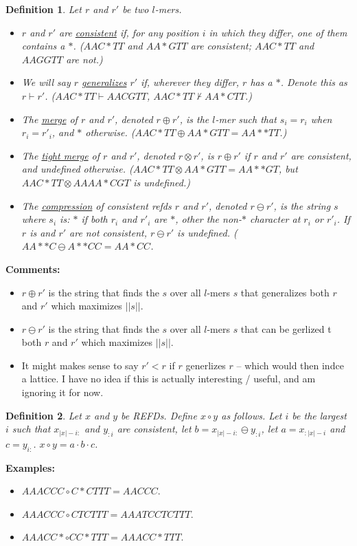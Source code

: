 \documentclass{article}
\newtheorem{definition}{Definition}
\begin{document}
\begin{definition}
Let $r$ and $r'$ be two $l$-mers.
\begin{itemize}
\item $r$ and $r'$ are \underline{consistent} if,
  for any position $i$ in which they differ, one of them contains a
  $*$.  ($AAC*TT$ and $AA*GTT$ are consistent; $AAC*TT$ and $AAGGTT$
  are not.)
\item We will say $r$ \underline{generalizes} $r'$ if, wherever they differ,
  $r$ has a $*$.  Denote this as $r \vdash r'$.  ($AAC*TT \vdash AACGTT$, 
  $AAC*TT \not\vdash AA*CTT$.)
\item The \underline{merge} of $r$ and $r'$, denoted $r \oplus r'$, is
  the $l$-mer such that $s_i = r_i$ when $r_i=r'_i$,
  and $*$ otherwise. ($AAC*TT \oplus AA*GTT = AA**TT$.) 
\item The \underline{tight merge} of $r$ and $r'$, denoted $r \otimes r'$,
  is $r \oplus r'$ if $r$ and $r'$ are consistent, and undefined
  otherwise. ($AAC*TT \otimes AA*GTT = AA**GT$, but $AAC*TT \otimes AAAA*CGT$ is undefined.)
\item The \underline{compression} of consistent refds $r$ and $r'$, denoted $r\ominus r'$, 
  is the string $s$ where $s_i$ is: $*$ if both $r_i$ and $r'_i$ are
  $*$, other the non-$*$ character at $r_i$ or $r'_i$.  If $r$ is and
  $r'$ are not consistent, $r \ominus r'$ is undefined.  ($AA**C
  \ominus A**CC = AA*CC$.
\end{itemize}
\end{definition}

{\bf Comments:}
\begin{itemize}
\item $r \oplus r'$ is the string that finds the $s$ over all
$l$-mers $s$ that generalizes both $r$ and $r'$ which maximizes $||s||$.
\item $r \ominus r'$ is the string that finds the $s$ over all
  $l$-mers $s$ that can be gerlized t both $r$ and $r'$ which
  maximizes $||s||$.
\item It might makes sense to say $r' < r$ if $r$ generlizes $r$ --
  which would then indce a lattice.  I have no idea if this is
  actually interesting / useful, and am ignoring it for now.
\end{itemize}


\begin{definition}
Let $x$ and $y$ be REFDs. Define $x \circ y$ as follows.  Let $i$ be
the largest $i$ such that $x_{|x|-i:}$ and $y_{:i}$ are consistent, let
$b = x_{|x|-i:} \ominus y_{:i}$, let $a = x_{:|x|-i}$ and $c = y_{i:}$.  
$x \circ y = a \cdot b \cdot c$.
\end{definition}
{\bf Examples:}
\begin{itemize}
\item $AAACCC \circ C*CTTT = AACCC$.
\item $AAACCC \circ CTCTTT = AAATCCTCTTT$.
\item $AAACC* \circ CC*TTT = AAACC*TTT$.
\end{itemize}
\end{document}
